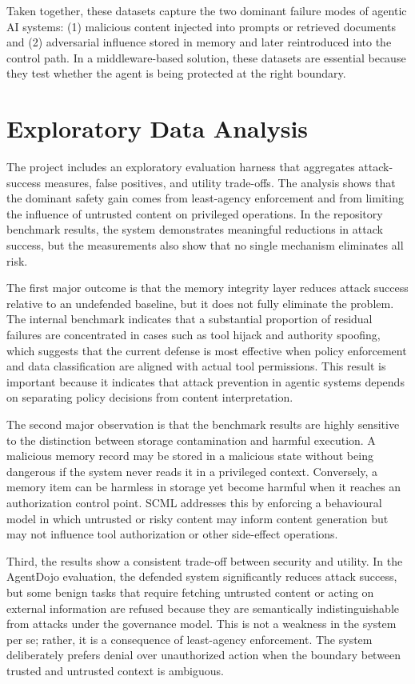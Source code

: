 \documentclass[12pt]{article}
\begin{document}
Taken together, these datasets capture the two dominant failure modes of agentic AI systems: (1) malicious content injected into prompts or retrieved documents and (2) adversarial influence stored in memory and later reintroduced into the control path. In a middleware-based solution, these datasets are essential because they test whether the agent is being protected at the right boundary.

\section{Exploratory Data Analysis}

The project includes an exploratory evaluation harness that aggregates attack-success measures, false positives, and utility trade-offs. The analysis shows that the dominant safety gain comes from least-agency enforcement and from limiting the influence of untrusted content on privileged operations. In the repository benchmark results, the system demonstrates meaningful reductions in attack success, but the measurements also show that no single mechanism eliminates all risk.

The first major outcome is that the memory integrity layer reduces attack success relative to an undefended baseline, but it does not fully eliminate the problem. The internal benchmark indicates that a substantial proportion of residual failures are concentrated in cases such as tool hijack and authority spoofing, which suggests that the current defense is most effective when policy enforcement and data classification are aligned with actual tool permissions. This result is important because it indicates that attack prevention in agentic systems depends on separating policy decisions from content interpretation.

The second major observation is that the benchmark results are highly sensitive to the distinction between storage contamination and harmful execution. A malicious memory record may be stored in a malicious state without being dangerous if the system never reads it in a privileged context. Conversely, a memory item can be harmless in storage yet become harmful when it reaches an authorization control point. SCML addresses this by enforcing a behavioural model in which untrusted or risky content may inform content generation but may not influence tool authorization or other side-effect operations.

Third, the results show a consistent trade-off between security and utility. In the AgentDojo evaluation, the defended system significantly reduces attack success, but some benign tasks that require fetching untrusted content or acting on external information are refused because they are semantically indistinguishable from attacks under the governance model. This is not a weakness in the system per se; rather, it is a consequence of least-agency enforcement. The system deliberately prefers denial over unauthorized action when the boundary between trusted and untrusted context is ambiguous.
\end{document}
